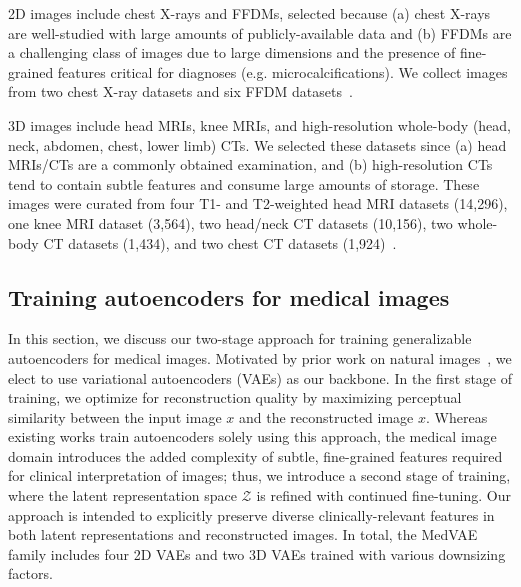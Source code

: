 2D images include chest X-rays and FFDMs, selected because (a) chest X-rays are well-studied with large amounts of publicly-available data and (b) FFDMs are a challenging class of images due to large dimensions and the presence of fine-grained features critical for diagnoses (e.g. microcalcifications). We collect images from two chest X-ray datasets and six FFDM datasets~\cite{johnson2019mimic,feng2021candid,jeong2022emory,sorkhei2021csaw,rsnamammo,nguyen2022vindrmammo,moreira2012inbreast,cai2023online}. 

3D images include head MRIs, knee MRIs, and high-resolution whole-body (head, neck, abdomen, chest, lower limb) CTs. We selected these datasets since (a) head MRIs/CTs are a commonly obtained examination, and (b) high-resolution CTs tend to contain subtle features and consume large amounts of storage. These images were curated from four T1- and T2-weighted head MRI datasets (14,296), one knee MRI dataset (3,564), two head/neck CT datasets (10,156), two whole-body CT datasets (1,434), and two chest CT datasets (1,924)~\cite{jack2008alzheimer,dagley2017harvard,insel2020a4,lamontagne2019oasis,bien2018deep,hooper2021impact,chilamkurthy2018development,wasserthal2023totalsegmentator,ji2022amos,armato2011lung,stanfordaimi_coca_2024}.

\subsection{Training autoencoders for medical images}
In this section, we discuss our two-stage approach for training generalizable autoencoders for medical images. Motivated by prior work on natural images~\cite{rombach2022high}, we elect to use variational autoencoders (VAEs) as our backbone. In the first stage of training, we optimize for reconstruction quality by maximizing perceptual similarity between the input image $x$ and the reconstructed image $\hat{x}$. Whereas existing works train autoencoders solely using this approach, the medical image domain introduces the added complexity of subtle, fine-grained features required for clinical interpretation of images; thus, we introduce a second stage of training, where the latent representation space $\mathcal{Z}$ is refined with continued fine-tuning. Our approach is intended to explicitly preserve diverse clinically-relevant features in both latent representations and reconstructed images. In total, the MedVAE family includes four 2D VAEs and two 3D VAEs trained with various downsizing factors.


